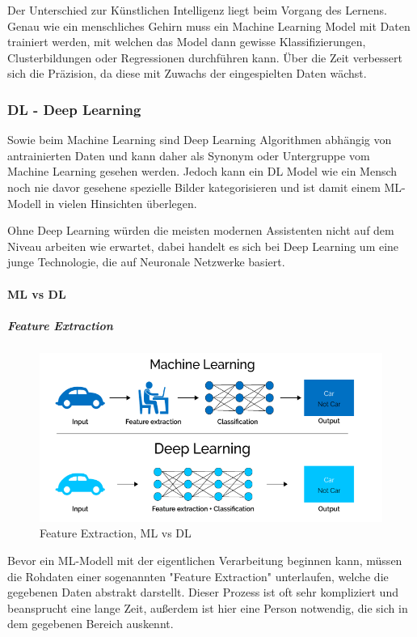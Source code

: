 Der Unterschied zur Künstlichen Intelligenz liegt beim Vorgang des Lernens. Genau wie ein menschliches Gehirn muss ein Machine Learning Model mit Daten trainiert werden, mit welchen das Model dann gewisse Klassifizierungen, Clusterbildungen oder Regressionen durchführen kann. Über die Zeit verbessert sich die Präzision, da diese mit Zuwachs der eingespielten Daten wächst.

\subsubsection{DL - Deep Learning}

Sowie beim Machine Learning sind Deep Learning Algorithmen abhängig von antrainierten Daten und kann daher als Synonym oder Untergruppe vom Machine Learning gesehen werden. Jedoch kann ein DL Model wie ein Mensch noch nie davor gesehene spezielle Bilder kategorisieren und ist damit einem ML-Modell in vielen Hinsichten überlegen. 

Ohne Deep Learning würden die meisten modernen Assistenten nicht auf dem Niveau arbeiten wie erwartet, dabei handelt es sich bei Deep Learning um eine junge Technologie, die auf Neuronale Netzwerke basiert.



\paragraph{ML vs DL}

\subparagraph{Feature Extraction}

\begin{figure}[h]
    \centering
    \includegraphics[scale=0.40]{sections/machine-learning/images/MLvsDL.png}
    \caption{Feature Extraction, ML vs DL}
    \label{fig:kimldl-comparison}
\end{figure}

Bevor ein ML-Modell mit der eigentlichen Verarbeitung beginnen kann, müssen die Rohdaten einer sogenannten "Feature Extraction" unterlaufen, welche die gegebenen Daten abstrakt darstellt. Dieser Prozess ist oft sehr kompliziert und beansprucht eine lange Zeit, außerdem ist hier eine Person notwendig, die sich in dem gegebenen Bereich auskennt.

